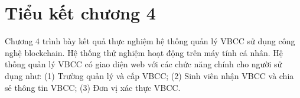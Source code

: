 \section{Tiểu kết chương 4}

Chương 4 trình bày kết quả thực nghiệm hệ thống quản lý VBCC sử dụng công nghệ blockchain. Hệ thống thử nghiệm hoạt động trên máy tính cá nhân. Hệ thống quản lý VBCC có giao diện web với các chức năng chính cho người sử dụng như: (1) Trường quản lý và cấp VBCC; (2) Sinh viên nhận VBCC và chia sẻ thông tin VBCC; (3) Đơn vị xác thực VBCC. 
